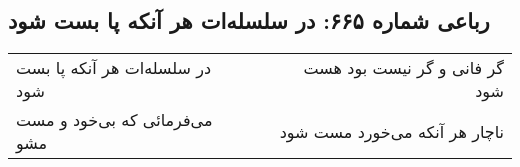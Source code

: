 \begin{center}
\section*{رباعی شماره ۶۶۵: در سلسله‌ات هر آنکه پا بست شود}
\label{sec:0665}
\begin{longtable}{l p{0.5cm} r}
در سلسله‌ات هر آنکه پا بست شود
&&
گر فانی و گر نیست بود هست شود
\\
می‌فرمائی که بی‌خود و مست مشو
&&
ناچار هر آنکه می‌خورد مست شود
\\
\end{longtable}
\end{center}
